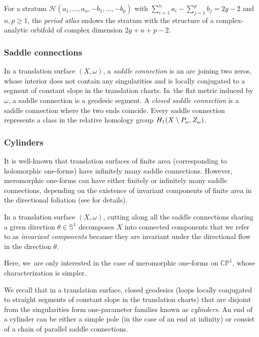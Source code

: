 For a stratum $\mathcal{H}(a_{1},\dots,a_{n},-b_{1},\dots,-b_{p})$ with $\sum_{i=1}^n a_{i} - \sum_{j=1}^p b_{j} =2g-2$ and $n,p \geq 1$, the \textit{period atlas} endows the stratum with the structure of a complex-analytic orbifold of complex dimension $2g+n+p-2$.

\subsubsection{Saddle connections}

In a translation surface $(X,\omega)$, a \textit{saddle connection} is an arc joining two zeros, whose interior does not contain any singularities and is locally conjugated to a segment of constant slope in the translation charts. In~the flat metric induced by $\omega$, a saddle connection is a geodesic segment. A \textit{closed saddle connection} is a saddle connection where the two ends coincide.
Every saddle connection represents a class in the relative homology group $H_{1}(X \setminus\nobreak P_{\omega}, Z_{\omega})$.

\subsubsection{Cylinders}

It is well-known that translation surfaces of finite area (corresponding to holomorphic one-forms) have infinitely many saddle connections. However, meromorphic one-forms can have either finitely or infinitely many saddle connections, depending on the existence of invariant components of finite area in the directional foliation (see \cite[\S5]{tahar} for details).

\begin{defn}
In a translation surface $(X,\omega)$, cutting along all the saddle connections sharing a given direction $\theta \in \mathbb{S}^{1}$ decomposes $X$ into connected components that we refer to as \textit{invariant components} because they are invariant under the directional flow in the direction $\theta$.
\end{defn}

Here, we~are only interested in the case of meromorphic one-forms on $\mathbb{CP}^{1}$, whose characterization is simpler.

We recall that in a translation surface, closed geodesics (loops locally conjugated to straight segments of constant slope in the translation charts) that are disjoint from the singularities form one-parameter families known as \textit{cylinders}. An end of a cylinder can be either a simple pole (in the case of an end at infinity) or consist of a chain of parallel saddle connections.

